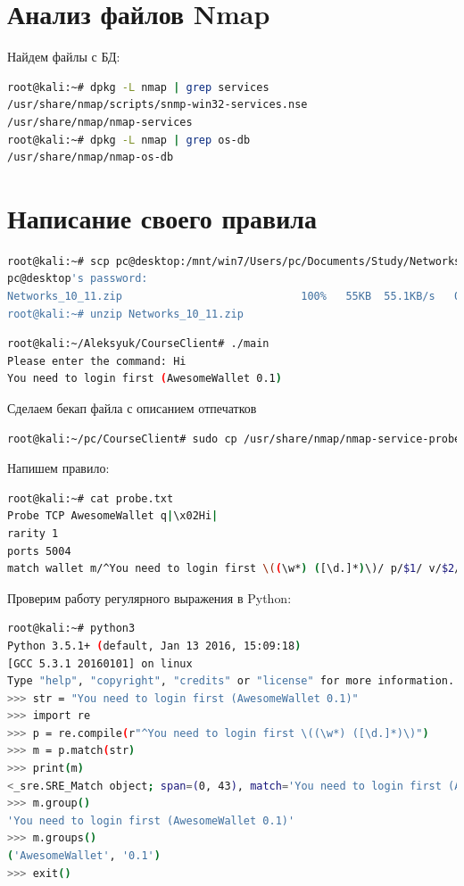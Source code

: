 \section{Анализ файлов Nmap}

Найдем файлы с БД:

\begin{lstlisting}[language=bash]
root@kali:~# dpkg -L nmap | grep services
/usr/share/nmap/scripts/snmp-win32-services.nse
/usr/share/nmap/nmap-services
root@kali:~# dpkg -L nmap | grep os-db
/usr/share/nmap/nmap-os-db
\end{lstlisting}

\section{Написание своего правила}

\begin{lstlisting}[language=bash]
root@kali:~# scp pc@desktop:/mnt/win7/Users/pc/Documents/Study/Networks_new/Networks_10_11.zip .
pc@desktop's password: 
Networks_10_11.zip                            100%   55KB  55.1KB/s   00:01    
root@kali:~# unzip Networks_10_11.zip 
\end{lstlisting}

\begin{lstlisting}[language=bash]
root@kali:~/Aleksyuk/CourseClient# ./main 
Please enter the command: Hi
You need to login first (AwesomeWallet 0.1)
\end{lstlisting}

Сделаем бекап файла с описанием отпечатков

\begin{lstlisting}[language=bash]
root@kali:~/pc/CourseClient# sudo cp /usr/share/nmap/nmap-service-probes /usr/share/nmap/nmap-service-probes.backup
\end{lstlisting}

Напишем правило:

\begin{lstlisting}[language=bash]
root@kali:~# cat probe.txt 
Probe TCP AwesomeWallet q|\x02Hi|
rarity 1
ports 5004
match wallet m/^You need to login first \((\w*) ([\d.]*)\)/ p/$1/ v/$2/
\end{lstlisting}

Проверим работу регулярного выражения в Python:

\begin{lstlisting}[language=bash]
root@kali:~# python3
Python 3.5.1+ (default, Jan 13 2016, 15:09:18) 
[GCC 5.3.1 20160101] on linux
Type "help", "copyright", "credits" or "license" for more information.
>>> str = "You need to login first (AwesomeWallet 0.1)"
>>> import re
>>> p = re.compile(r"^You need to login first \((\w*) ([\d.]*)\)")
>>> m = p.match(str)
>>> print(m)
<_sre.SRE_Match object; span=(0, 43), match='You need to login first (AwesomeWallet 0.1)'>
>>> m.group()
'You need to login first (AwesomeWallet 0.1)'
>>> m.groups()
('AwesomeWallet', '0.1')
>>> exit()
\end{lstlisting}

